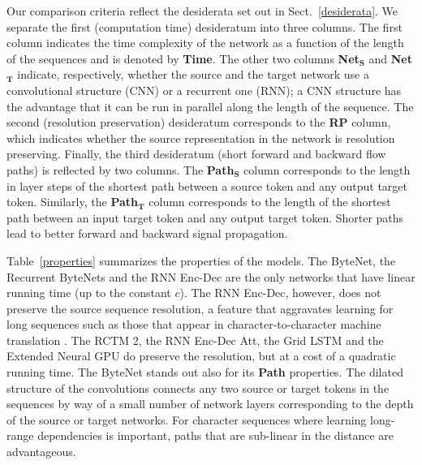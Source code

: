 \documentclass{article}
\begin{document}
Our comparison criteria reflect the desiderata set out in Sect.~\ref{desiderata}.
We separate the first (computation time) desideratum into three columns. The first column indicates the time complexity of the network as a function of the length of the sequences and is denoted by \textbf{Time}. The other two columns \textbf{Net$_\mathbf{S}$} and \textbf{Net$_\mathbf{T}$} indicate, respectively, whether the source and the target network use a convolutional structure (CNN) or a recurrent one (RNN); a CNN structure has the advantage that it can be run in parallel along the length of the sequence. 
The second (resolution preservation) desideratum corresponds to the \textbf{RP} column, which indicates whether the source representation in the network is resolution preserving. 
Finally, the third desideratum (short forward and backward flow paths) is reflected by two columns.
The \textbf{Path$_\mathbf{S}$} column corresponds to the length in layer steps of the shortest path between a source token and any output target token. Similarly, the \textbf{Path$_\mathbf{T}$} column corresponds to the length of the shortest path between an input target token and any output target token. 
Shorter paths lead to better forward and backward signal propagation.

Table~\ref{properties} summarizes the properties of the models. The ByteNet, the Recurrent ByteNets and the RNN Enc-Dec are the only networks that have linear running time (up to the constant $c$). The RNN Enc-Dec, however, does not preserve the source sequence resolution, a feature that aggravates learning for long sequences such as those that appear in character-to-character machine translation  \citep{DBLP:conf/acl/LuongM16}. The RCTM 2, the RNN Enc-Dec Att, the Grid LSTM and the Extended Neural GPU do preserve the resolution, but at a cost of a quadratic running time. The ByteNet stands out also for its \textbf{Path} properties. The dilated structure of the convolutions connects any two source or target tokens in the sequences by way of a small number of network layers corresponding to the depth of the source or target networks. For character sequences where learning long-range dependencies is important, paths that are sub-linear in the distance are advantageous. 
\end{document}
